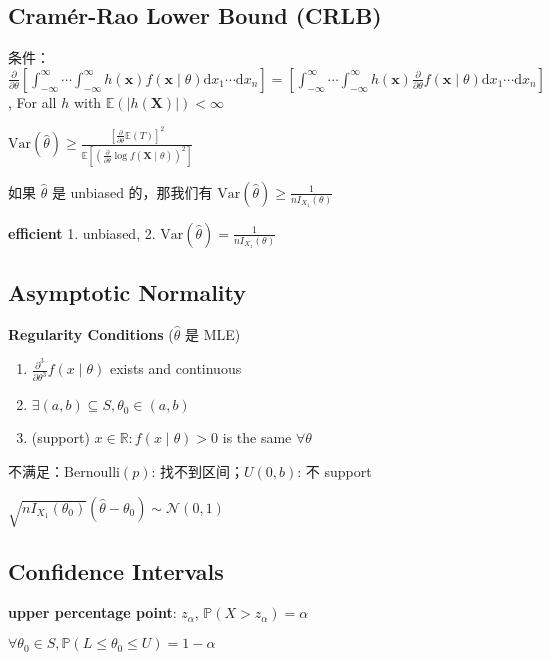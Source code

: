 \documentclass[9pt,landscape]{article}
\begin{document}
\begin{multicols}{3}
\subsection{Cramér-Rao Lower Bound (CRLB)}

条件：$\frac{\partial}{\partial\theta}\left[\int_{-\infty}^{\infty}\cdots\int_{-\infty}^{\infty}h(\boldsymbol{x})f(\boldsymbol{x}\mid\theta)\mathrm{d}x_1\cdots\mathrm{d}x_n\right]=\left[\int_{-\infty}^{\infty}\cdots\int_{-\infty}^{\infty}h(\boldsymbol{x})\frac{\partial}{\partial\theta}f(\boldsymbol{x}\mid\theta)\mathrm{d}x_1\cdots\mathrm{d}x_n\right]$, For all $h$ with $\mathbb{E}(|h(\boldsymbol{X})|)<\infty$

$\mathrm{Var}(\hat{\theta})\ge \frac{\left[\frac{\partial}{\partial\theta}\mathbb{E}(T)\right]^2}{\mathbb{E}\left[\left(\frac{\partial}{\partial\theta}\log f(\boldsymbol{X}\mid\theta)\right)^2	\right]}$

如果 $\hat{\theta}$ 是 unbiased 的，那我们有 $\mathrm{Var}(\hat{\theta})\ge\frac{1}{nI_{X_1}(\theta)}$

\textbf{efficient} 1. unbiased, 2. $\mathrm{Var}(\hat{\theta})=\frac{1}{nI_{X_1}(\theta)}$

\subsection{Asymptotic Normality}

\textbf{Regularity Conditions} ($\hat{\theta}$ 是 MLE)
\begin{enumerate}
	\item $\frac{\partial^3}{\partial\theta^3}f(x\mid\theta)$ exists and continuous
	\item $\exists (a, b)\subseteq S, \theta_0\in(a, b)$
	\item (support) ${x\in\mathbb{R}: f(x\mid\theta)>0}$ is the same $\forall\theta$
\end{enumerate}

不满足：$\mathrm{Bernoulli}(p)$: 找不到区间；$U(0, b)$: 不 support

$\sqrt{nI_{X_1}(\theta_0)}(\hat{\theta}-\theta_0)\sim\mathcal{N}(0, 1)$

\subsection{Confidence Intervals}

\textbf{upper percentage point}: $z_\alpha$, $\mathbb{P}(X>z_\alpha)=\alpha$

$\forall\theta_0\in S, \mathbb{P}(L\le \theta_0\le U)=1-\alpha$


\end{multicols}
\end{document}
